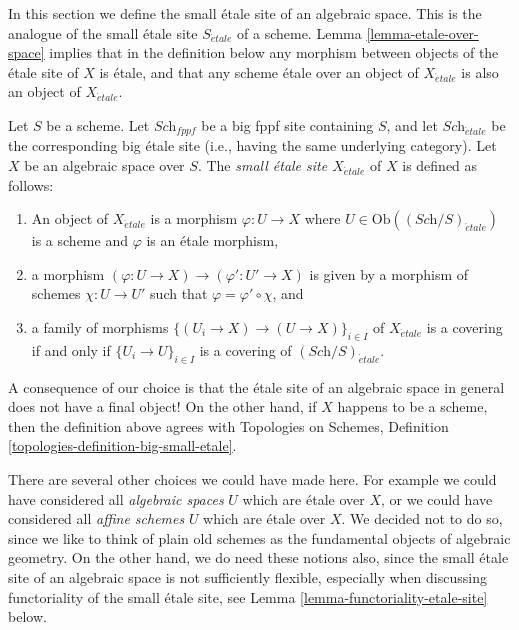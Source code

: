\noindent
In this section we define the small \'etale site of an algebraic space.
This is the analogue of the small \'etale site $S_{\acute{e}tale}$ of a scheme.
Lemma \ref{lemma-etale-over-space} implies that in the definition below
any morphism between objects of the \'etale site of $X$ is \'etale, and that
any scheme \'etale over an object of $X_{\acute{e}tale}$ is also an object of
$X_{\acute{e}tale}$.

\begin{definition}
\label{definition-etale-site}
Let $S$ be a scheme.
Let $\textit{Sch}_{fppf}$ be a big fppf site containing $S$,
and let $\textit{Sch}_{\acute{e}tale}$ be the corresponding big \'etale site
(i.e., having the same underlying category).
Let $X$ be an algebraic space over $S$.
The {\it small \'etale site $X_{\acute{e}tale}$} of $X$ is defined as follows:
\begin{enumerate}
\item An object of $X_{\acute{e}tale}$ is a morphism $\varphi : U \to X$
where $U \in \text{Ob}((\textit{Sch}/S)_{\acute{e}tale})$ is a scheme and
$\varphi$ is an \'etale morphism,
\item a morphism $(\varphi : U \to X) \to (\varphi' : U' \to X)$
is given by a morphism of schemes $\chi : U \to U'$ such that
$\varphi = \varphi' \circ \chi$, and
\item a family of morphisms $\{(U_i \to X) \to (U \to X)\}_{i \in I}$
of $X_{\acute{e}tale}$ is a covering if and only if $\{U_i \to U\}_{i \in I}$
is a covering of $(\textit{Sch}/S)_{\acute{e}tale}$.
\end{enumerate}
\end{definition}

\noindent
A consequence of our choice is that the \'etale site of an algebraic space
in general does not have a final object! On the other hand, if $X$ happens
to be a scheme, then the definition above agrees with
Topologies on Schemes,
Definition \ref{topologies-definition-big-small-etale}.

\medskip\noindent
There are several other choices we could have made here. For example
we could have considered all {\it algebraic spaces} $U$ which are \'etale
over $X$, or we could have considered all {\it affine schemes} $U$ which
are \'etale over $X$. We decided not to do so, since we like to think of
plain old schemes as the fundamental objects of algebraic geometry. On
the other hand, we do need these notions also, since the small \'etale site
of an algebraic space is not sufficiently flexible, especially when
discussing functoriality of the small \'etale site, see
Lemma \ref{lemma-functoriality-etale-site}
below.

